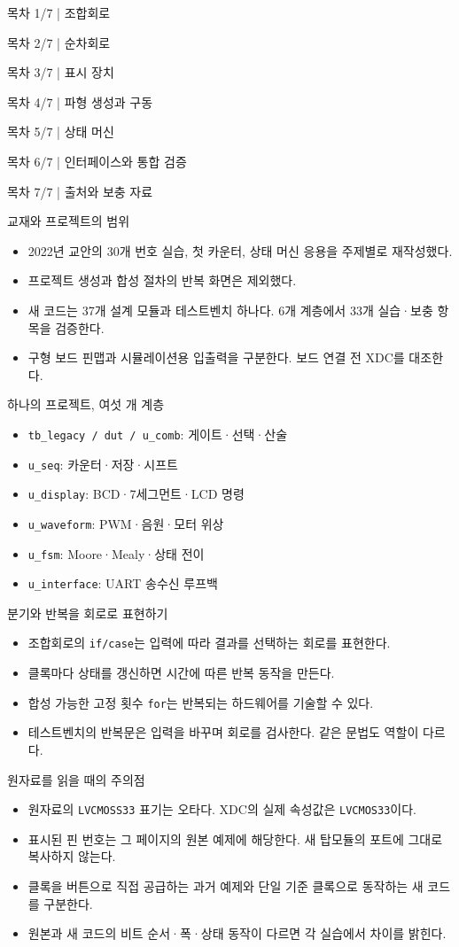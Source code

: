 \documentclass[aspectratio=169,11pt]{beamer}
\newcommand{\chaptercontents}[2]{%
  \begin{frame}[t]{#2}
    \tableofcontents[sections={#1},sectionstyle=show/show,subsectionstyle=show/show/show]
  \end{frame}}
\begin{document}
\chaptercontents{1}{목차 1/7 | 조합회로}
\chaptercontents{2}{목차 2/7 | 순차회로}
\chaptercontents{3}{목차 3/7 | 표시 장치}
\chaptercontents{4}{목차 4/7 | 파형 생성과 구동}
\chaptercontents{5}{목차 5/7 | 상태 머신}
\chaptercontents{6}{목차 6/7 | 인터페이스와 통합 검증}
\chaptercontents{7}{목차 7/7 | 출처와 보충 자료}
\begin{frame}{교재와 프로젝트의 범위}
\begin{itemize}
\item 2022년 교안의 30개 번호 실습, 첫 카운터, 상태 머신 응용을 주제별로 재작성했다.
\item 프로젝트 생성과 합성 절차의 반복 화면은 제외했다.
\item 새 코드는 37개 설계 모듈과 테스트벤치 하나다. 6개 계층에서 33개 실습·보충 항목을 검증한다.
\item 구형 보드 핀맵과 시뮬레이션용 입출력을 구분한다. 보드 연결 전 XDC를 대조한다.
\end{itemize}
\end{frame}
\begin{frame}{하나의 프로젝트, 여섯 개 계층}
\begin{itemize}
\item \texttt{tb\_legacy / dut / u\_comb}: 게이트·선택·산술
\item \texttt{u\_seq}: 카운터·저장·시프트
\item \texttt{u\_display}: BCD·7세그먼트·LCD 명령
\item \texttt{u\_waveform}: PWM·음원·모터 위상
\item \texttt{u\_fsm}: Moore·Mealy·상태 전이
\item \texttt{u\_interface}: UART 송수신 루프백
\end{itemize}
\end{frame}
\begin{frame}{분기와 반복을 회로로 표현하기}
\begin{itemize}
\item 조합회로의 \texttt{if/case}는 입력에 따라 결과를 선택하는 회로를 표현한다.
\item 클록마다 상태를 갱신하면 시간에 따른 반복 동작을 만든다.
\item 합성 가능한 고정 횟수 \texttt{for}는 반복되는 하드웨어를 기술할 수 있다.
\item 테스트벤치의 반복문은 입력을 바꾸며 회로를 검사한다. 같은 문법도 역할이 다르다.
\end{itemize}
\end{frame}
\begin{frame}{원자료를 읽을 때의 주의점}
\begin{itemize}
\item 원자료의 \texttt{LVCMOSS33} 표기는 오타다. XDC의 실제 속성값은 \texttt{LVCMOS33}이다.
\item 표시된 핀 번호는 그 페이지의 원본 예제에 해당한다. 새 탑모듈의 포트에 그대로 복사하지 않는다.
\item 클록을 버튼으로 직접 공급하는 과거 예제와 단일 기준 클록으로 동작하는 새 코드를 구분한다.
\item 원본과 새 코드의 비트 순서·폭·상태 동작이 다르면 각 실습에서 차이를 밝힌다.
\end{itemize}
\end{frame}
\end{document}
